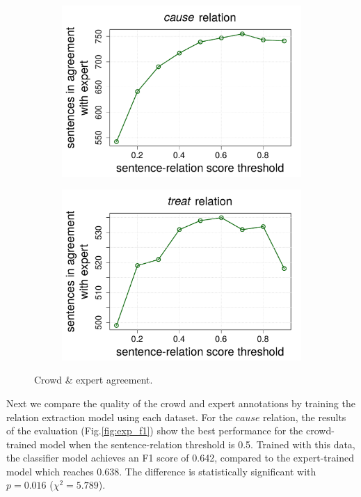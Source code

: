 \begin{figure}[htb!]
\centering
\begin{subfigure}{.5\textwidth}
\includegraphics[width=\linewidth]{img/cause_expert_agr.pdf}
\end{subfigure}%
\begin{subfigure}{.5\textwidth}
\includegraphics[width=\linewidth]{img/treats_expert_agr.pdf}
\end{subfigure}
\caption{Crowd \& expert agreement.}
\label{fig:crowd_exp_agr}
\end{figure}

Next we compare the quality of the crowd and expert annotations by training the relation extraction model using each dataset. For the $cause$ relation, the results of the evaluation (Fig.\ref{fig:exp_f1}) show the best performance for the crowd-trained model when the sentence-relation threshold is 0.5. Trained with this data, the classifier model achieves an F1 score of 0.642, compared to the expert-trained model which reaches 0.638. The difference is statistically significant with $p = 0.016$ ($\chi^2 = 5.789$).

